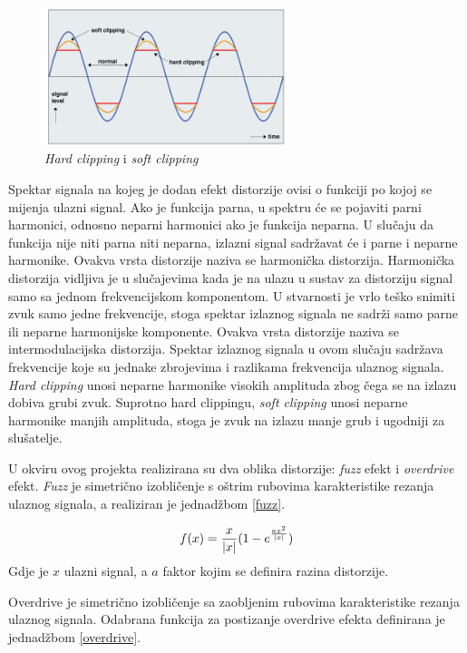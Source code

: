 \documentclass[conference]{IEEEtran}
\begin{document}
\begin{figure}[H]
    \includegraphics[width=200pt]{slike/dist_2.jpg}
    \centering
    \caption{\textit{Hard clipping} i \textit{soft clipping}}
    \label{dist_2}
\end{figure}

Spektar signala na kojeg je dodan efekt distorzije ovisi o funkciji po kojoj se mijenja ulazni signal. Ako je
funkcija parna, u spektru će se pojaviti parni harmonici, odnosno neparni harmonici ako je funkcija neparna.
U slučaju da funkcija nije niti parna niti neparna, izlazni signal sadržavat će i parne i neparne harmonike.
Ovakva vrsta distorzije naziva se harmonička distorzija. Harmonička distorzija vidljiva je u slučajevima kada
je na ulazu u sustav za distorziju signal samo sa jednom frekvencijskom komponentom. U stvarnosti je vrlo teško
snimiti zvuk samo jedne frekvencije, stoga spektar izlaznog signala ne sadrži samo parne ili neparne harmonijske
komponente. Ovakva vrsta distorzije naziva se intermodulacijska distorzija. Spektar izlaznog signala u ovom slučaju
sadržava frekvencije koje su jednake zbrojevima i razlikama frekvencija ulaznog signala.
\textit{Hard clipping} unosi neparne harmonike visokih amplituda zbog čega se na izlazu dobiva grubi zvuk.
Suprotno hard clippingu, \textit{soft clipping} unosi neparne harmonike manjih amplituda, stoga je zvuk na izlazu
manje grub i ugodniji za slušatelje.

U okviru ovog projekta realizirana su dva oblika distorzije: \textit{fuzz} efekt i \textit{overdrive} efekt.
\textit{Fuzz} je simetrično izobličenje s oštrim rubovima karakteristike rezanja ulaznog signala, a realiziran je
jednadžbom \ref{fuzz}.

\begin{equation}
  f(x)=\frac{x}{|x|}\*(1-e^{\frac{a\*x^2}{|x|}})
  \label{fuzz}
\end{equation}
Gdje je $x$ ulazni signal, a $a$ faktor kojim se definira razina distorzije.

Overdrive je simetrično izobličenje sa zaobljenim rubovima karakteristike rezanja ulaznog signala. Odabrana
funkcija za postizanje overdrive efekta definirana je jednadžbom \ref{overdrive}.
\end{document}
